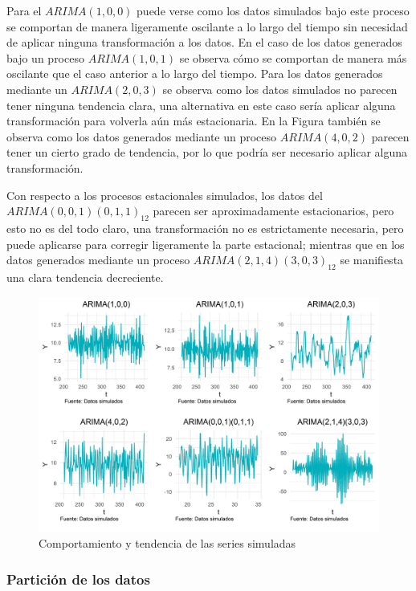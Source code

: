 \documentclass[
]{article}
\begin{document}
Para el \(ARIMA(1,0,0)\) puede verse como los datos simulados bajo este
proceso se comportan de manera ligeramente oscilante a lo largo del
tiempo sin necesidad de aplicar ninguna transformación a los datos. En
el caso de los datos generados bajo un proceso \(ARIMA(1,0,1)\) se
observa cómo se comportan de manera más oscilante que el caso anterior a
lo largo del tiempo. Para los datos generados mediante un
\(ARIMA(2,0,3)\) se observa como los datos simulados no parecen tener
ninguna tendencia clara, una alternativa en este caso sería aplicar
alguna transformación para volverla aún más estacionaria. En la Figura
también se observa como los datos generados mediante un proceso
\(ARIMA(4,0,2)\) parecen tener un cierto grado de tendencia, por lo que
podría ser necesario aplicar alguna transformación.

Con respecto a los procesos estacionales simulados, los datos del
\(ARIMA(0,0,1)(0,1,1)_{12}\) parecen ser aproximadamente estacionarios,
pero esto no es del todo claro, una transformación no es estrictamente
necesaria, pero puede aplicarse para corregir ligeramente la parte
estacional; mientras que en los datos generados mediante un proceso
\(ARIMA(2,1,4)(3,0,3)_{12}\) se manifiesta una clara tendencia
decreciente.

\begin{figure}[H]
\includegraphics[width=1\linewidth,height=1\textheight]{Tesis_files/figure-latex/series_simuladas-1} \caption{Comportamiento y tendencia de las series simuladas}\label{fig:series_simuladas}
\end{figure}

\subsubsection{Partición de los datos}
\end{document}
